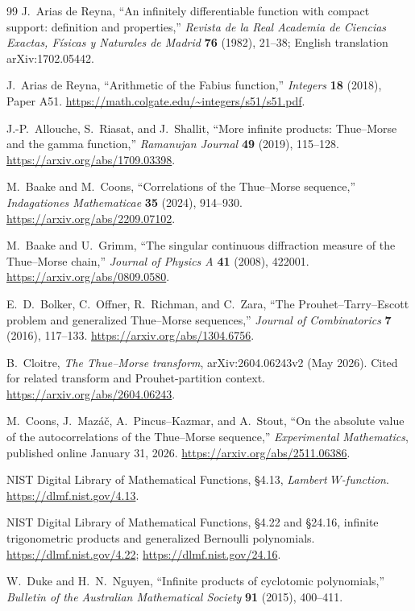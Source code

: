 \documentclass[11pt,a4paper,oneside,openany]{book}
\numberwithin{equation}{chapter}
\theoremstyle{definition}
\theoremstyle{remark}
\begin{document}
\begin{thebibliography}{99}
J.~Arias de Reyna, ``An infinitely differentiable function with compact
support: definition and properties,'' \emph{Revista de la Real Academia de
Ciencias Exactas, F\'isicas y Naturales de Madrid} \textbf{76} (1982),
21--38; English translation arXiv:1702.05442.

J.~Arias de Reyna, ``Arithmetic of the Fabius function,'' \emph{Integers}
\textbf{18} (2018), Paper A51.
\url{https://math.colgate.edu/~integers/s51/s51.pdf}.

J.-P.~Allouche, S.~Riasat, and J.~Shallit, ``More infinite products:
Thue--Morse and the gamma function,'' \emph{Ramanujan Journal} \textbf{49}
(2019), 115--128. \url{https://arxiv.org/abs/1709.03398}.

M.~Baake and M.~Coons, ``Correlations of the Thue--Morse sequence,''
\emph{Indagationes Mathematicae} \textbf{35} (2024), 914--930.
\url{https://arxiv.org/abs/2209.07102}.

M.~Baake and U.~Grimm, ``The singular continuous diffraction measure of the
Thue--Morse chain,'' \emph{Journal of Physics A} \textbf{41} (2008), 422001.
\url{https://arxiv.org/abs/0809.0580}.

E.~D.~Bolker, C.~Offner, R.~Richman, and C.~Zara, ``The
Prouhet--Tarry--Escott problem and generalized Thue--Morse sequences,''
\emph{Journal of Combinatorics} \textbf{7} (2016), 117--133.
\url{https://arxiv.org/abs/1304.6756}.

B.~Cloitre, \emph{The Thue--Morse transform}, arXiv:2604.06243v2 (May 2026).
Cited for related transform and Prouhet-partition context.
\url{https://arxiv.org/abs/2604.06243}.

M.~Coons, J.~Maz\'a\v c, A.~Pincus--Kazmar, and A.~Stout, ``On the absolute
value of the autocorrelations of the Thue--Morse sequence,''
\emph{Experimental Mathematics}, published online January 31, 2026.
\url{https://arxiv.org/abs/2511.06386}.

NIST Digital Library of Mathematical Functions, \S4.13, \emph{Lambert
$W$-function}. \url{https://dlmf.nist.gov/4.13}.

NIST Digital Library of Mathematical Functions, \S4.22 and \S24.16,
infinite trigonometric products and generalized Bernoulli polynomials.
\url{https://dlmf.nist.gov/4.22}; \url{https://dlmf.nist.gov/24.16}.

W.~Duke and H.~N.~Nguyen, ``Infinite products of cyclotomic polynomials,''
\emph{Bulletin of the Australian Mathematical Society} \textbf{91} (2015),
400--411.


\end{thebibliography}
\end{document}
